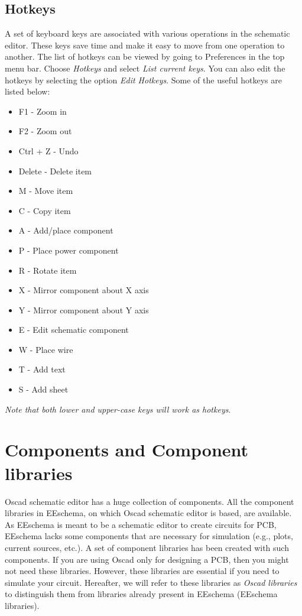\subsection{Hotkeys} 
\label{short}
A set of keyboard keys are associated with various operations in the schematic editor. These keys save time and make it easy to move from one operation to another. The list of hotkeys can be viewed by going to Preferences in the top menu bar. Choose \textit{Hotkeys} and select \textit{List current keys}. You can also edit the hotkeys by selecting the option \textit{Edit Hotkeys}.
Some of the useful hotkeys are listed below:
\begin{itemize}
\item F1 - Zoom in
\item F2 - Zoom out
\item Ctrl + Z - Undo
\item Delete - Delete item
\item M - Move item
\item C - Copy item
\item A - Add/place component 
\item P - Place power component
\item R - Rotate item
\item X - Mirror component about X axis
\item Y - Mirror component about Y axis
\item E - Edit schematic component
\item W - Place wire
\item T - Add text
\item S - Add sheet
\end{itemize}
\textit{Note that both lower and upper-case keys will work as hotkeys}.
\section{Components and Component libraries}
\label{component}
Oscad schematic editor has a huge collection of components. All the component libraries in EEschema, on which Oscad schematic editor is based, are available. As EEschema is meant to be a schematic editor to create circuits for PCB, EEschema lacks some components that are necessary for simulation (e.g., plots, current sources, etc.). A set of component libraries has been created with such components. 
If you are using Oscad only for designing a PCB, then you might not need these libraries. However, these libraries are essential if you need to simulate your circuit. Hereafter, we will refer to these libraries as \textit{Oscad libraries} to distinguish them from libraries already present in EEschema (EEschema libraries).
